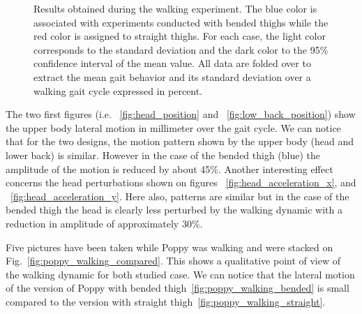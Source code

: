 \begin{figure}[h]
    \hfil
    \hfil
    \hfil
    \caption{Results obtained during the walking experiment. The blue color is associated with experiments conducted with bended thighs while the red color is assigned to straight thighs. For each case, the light color corresponds to the standard deviation and the dark color to the 95\% confidence interval of the mean value. All data are folded over to extract the mean gait behavior and its standard deviation over a walking gait cycle expressed in percent.}
    \label{fig:walk_result}
\end{figure}

The two first figures (i.e. ~\ref{fig:head_position} and ~\ref{fig:low_back_position}) show the upper body lateral motion in millimeter over the gait cycle. We can notice that for the two designs, the motion pattern shown by the upper body (head and lower back) is similar. However in the case of the bended thigh (blue) the amplitude of the motion is reduced by about 45\%. Another interesting effect concerns the head perturbations shown on figures ~\ref{fig:head_acceleration_x}, and ~\ref{fig:head_acceleration_y}. Here also, patterns are similar but in the case of the bended thigh the head is clearly less perturbed by the walking dynamic with a reduction in amplitude of approximately 30\%.

Five pictures have been taken while Poppy was walking and were stacked on Fig.~\ref{fig:poppy_walking_compared}. This shows a qualitative point of view of the walking dynamic for both studied case. We can notice that the lateral motion of the version of Poppy with bended thigh~\ref{fig:poppy_walking_bended} is small compared to the version with straight thigh~\ref{fig:poppy_walking_straight}.


